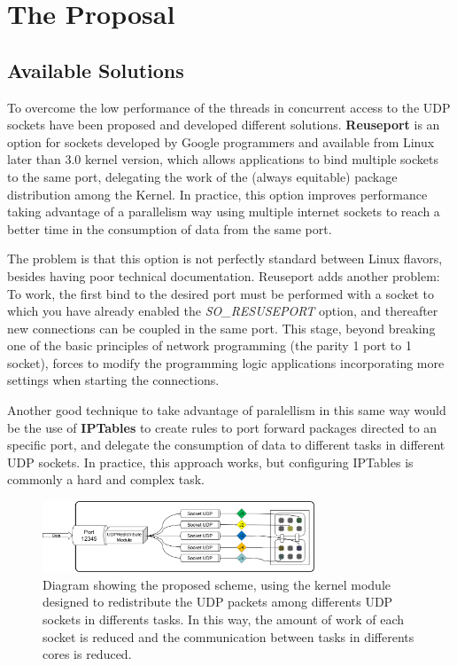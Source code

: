 \documentclass[journal]{IEEEtran}
\begin{document}
\section{The Proposal}

\subsection{Available Solutions}
To overcome the low performance of the threads in concurrent access to the UDP sockets have been proposed and developed different solutions. \textbf{Reuseport} is an option for sockets developed by Google programmers and available from Linux later than 3.0 kernel version, which allows applications to bind multiple sockets to the same port, delegating the work of the (always equitable) package distribution among the Kernel. In practice, this option improves performance taking advantage of a parallelism way using multiple internet sockets to reach a better time in the consumption of data from the same port.

The problem is that this option is not perfectly standard between Linux flavors, besides having poor technical documentation. Reuseport adds another problem: To work, the first bind to the desired port must be performed with a socket to which you have already enabled the \emph{SO\_RESUSEPORT} option, and thereafter new connections can be coupled in the same port. This stage, beyond breaking one of the basic principles of network programming (the parity 1 port to 1 socket), forces to modify the programming logic applications incorporating more settings when starting the connections.

Another good technique to take advantage of paralellism in this same way would be the use of \textbf{IPTables} to create rules to port forward packages directed to an specific port, and delegate the consumption of data to different tasks in different UDP sockets. In practice, this approach works, but configuring IPTables is commonly a hard and complex task.

\begin{figure}[!h]
\centering
  \includegraphics[width=3.2in]{Imagenes/diagrama2}
  \caption{Diagram showing the proposed scheme, using the kernel module designed to redistribute the UDP packets among differents UDP sockets in differents tasks. In this way, the amount of work of each socket is reduced and the communication between tasks in differents cores is reduced.}
  \label{fig:diag2}
\end{figure}
\end{document}
